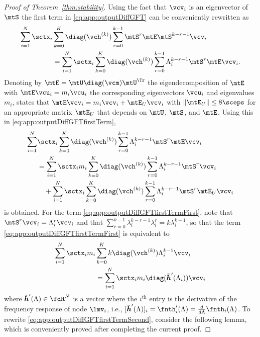 \begin{proof}[Proof of Theorem~\ref{thm:stability}]
Using the fact that $\vcv_{i}$ is an eigenvector of $\mtS$ the first term in \eqref{eq:app:outputDiffGFT} can be conveniently rewritten as
\begin{equation} \label{eq:app:outputDiffGFTfirstTerm}
%
\begin{aligned}
    \sum_{i=1}^{N} \sctx_{i} & \sum_{k=0}^{K} \diag(\vch^{(k)}) \sum_{r=0}^{k-1} \mtS^{r} \mtE \mtS^{k-r-1} \vcv_{i} \\ & = \sum_{i=1}^{N} \sctx_{i} \sum_{k=0}^{K} \diag(\vch^{(k)}) \sum_{r=0}^{k-1}\lambda_{i}^{k-r-1}\mtS^{r} \mtE \vcv_{i}.
\end{aligned}
%
\end{equation}
%
Denoting by $\mtE = \mtU \diag(\vcm) \mtU^{\Tr}$ the eigendecomposition of $\mtE$ with $\mtE\vcu_{i} = m_{i}\vcu_{i}$ the corresponding eigenvectors $\vcu_{i}$ and eigenvalues $m_{i}$, \cite[Lemma 1]{Gama2020-Stability} states that $\mtE \vcv_{i} = m_{i} \vcv_{i} + \mtE_{U} \vcv_{i}$ with $\| \mtE_{U}\| \leq 8\sceps$ for an appropriate matrix $\mtE_{U}$ that depends on $\mtU$, $\mtS$, and $\mtE$. Using this in \eqref{eq:app:outputDiffGFTfirstTerm},
%
\begin{align}
    \sum_{i=1}^{N} & \sctx_{i} \sum_{k=0}^{K} \diag(\vch^{(k)}) \sum_{r=0}^{k-1}\lambda_{i}^{k-r-1}\mtS^{r} \mtE \vcv_{i} \nonumber \\ & =
    \sum_{i=1}^{N} \sctx_{i} m_{i} \sum_{k=0}^{K} \diag(\vch^{(k)}) \sum_{r=0}^{k-1}\lambda_{i}^{k-r-1}\mtS^{r} \vcv_{i} \label{eq:app:outputDiffGFTfirstTermFirst}\\
    & \quad + \sum_{i=1}^{N} \sctx_{i} \sum_{k=0}^{K} \diag(\vch^{(k)}) \sum_{r=0}^{k-1}\lambda_{i}^{k-r-1}\mtS^{r} \mtE_{U} \vcv_{i}\label{eq:app:outputDiffGFTfirstTermSecond}
\end{align}
%
is obtained. For the term \eqref{eq:app:outputDiffGFTfirstTermFirst}, note that $\mtS^{r} \vcv_{i} = \lambda_{i}^{r} \vcv_{i}$ and that $\sum_{r=0}^{k-1} \lambda_{i}^{k-r-1}\lambda_{i}^{r} = k \lambda_{i}^{k-1}$, so that the term \eqref{eq:app:outputDiffGFTfirstTermFirst} is equivalent to
\begin{equation} \label{eq:app:outputDiffGFTfirstTermFirstSolved}
%
\begin{aligned}
    \sum_{i=1}^{N} \sctx_{i} m_{i} & \sum_{k=0}^{K} k\diag(\vch^{(k)})\lambda_{i}^{k-1} \vcv_{i} \\
    & = \sum_{i=1}^{N} \sctx_{i} m_{i} \diag(\vcfnth'(\lambda_{i}))\vcv_{i}
\end{aligned}
%
\end{equation}
%
where $\vcfnth'(\lambda) \in \fdR^{N}$ is a vector where the $i^{\text{th}}$ entry is the derivative of the frequency response of node $\lmv_{i}$, i.e., $[\vcfnth'(\lambda)]_{i} = \fnth'_{i}(\lambda) = \frac{d}{d\lambda} \fnth_{i} (\lambda)$. To rewrite \eqref{eq:app:outputDiffGFTfirstTermSecond}, consider the following lemma, which is conveniently proved after completing the current proof.


\end{proof}
